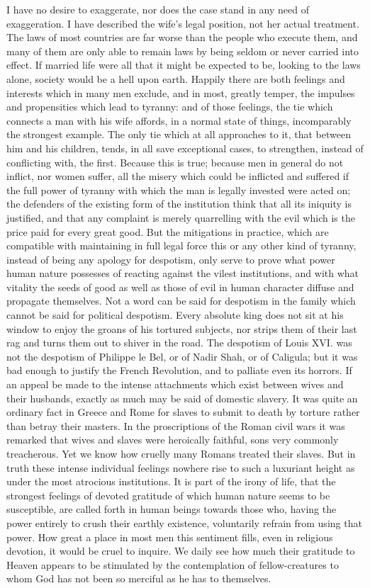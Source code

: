 \documentclass[12pt]{report}
\begin{document}
I have no desire to exaggerate, nor does the case stand in any need of exaggeration. I have described the wife's legal position, not her actual treatment. The laws of most countries are far worse than the people who execute them, and many of them are only able to remain laws by being seldom or never carried into effect. If married life were all that it might be expected to be, looking to the laws alone, society would be a hell upon earth. Happily there are both feelings and interests which in many men exclude, and in most, greatly temper, the impulses and propensities which lead to tyranny: and of those feelings, the tie which connects a man with his wife affords, in a normal state of things, incomparably the strongest example. The only tie which at all approaches to it, that between him and his children, tends, in all save exceptional cases, to strengthen, instead of conflicting with, the first. Because this is true; because men in general do not inflict, nor women suffer, all the misery which could be inflicted and suffered if the full power of tyranny with which the man is legally invested were acted on; the defenders of the existing form of the institution think that all its iniquity is justified, and that any complaint is merely quarrelling with the evil which is the price paid for every great good. But the mitigations in practice, which are compatible with maintaining in full legal force this or any other kind of tyranny, instead of being any apology for despotism, only serve to prove what power human nature possesses of reacting against the vilest institutions, and with what vitality the seeds of good as well as those of evil in human character diffuse and propagate themselves. Not a word can be said for despotism in the family which cannot be said for political despotism. Every absolute king does not sit at his window to enjoy the groans of his tortured subjects, nor strips them of their last rag and turns them out to shiver in the road. The despotism of Louis XVI. was not the despotism of Philippe le Bel, or of Nadir Shah, or of Caligula; but it was bad enough to justify the French Revolution, and to palliate even its horrors. If an appeal be made to the intense attachments which exist between wives and their husbands, exactly as much may be said of domestic slavery. It was quite an ordinary fact in Greece and Rome for slaves to submit to death by torture rather than betray their masters. In the proscriptions of the Roman civil wars it was remarked that wives and slaves were heroically faithful, sons very commonly treacherous. Yet we know how cruelly many Romans treated their slaves. But in truth these intense individual feelings nowhere rise to such a luxuriant height as under the most atrocious institutions. It is part of the irony of life, that the strongest feelings of devoted gratitude of which human nature seems to be susceptible, are called forth in human beings towards those who, having the power entirely to crush their earthly existence, voluntarily refrain from using that power. How great a place in most men this sentiment fills, even in religious devotion, it would be cruel to inquire. We daily see how much their gratitude to Heaven appears to be stimulated by the contemplation of fellow-creatures to whom God has not been so merciful as he has to themselves.
\end{document}
